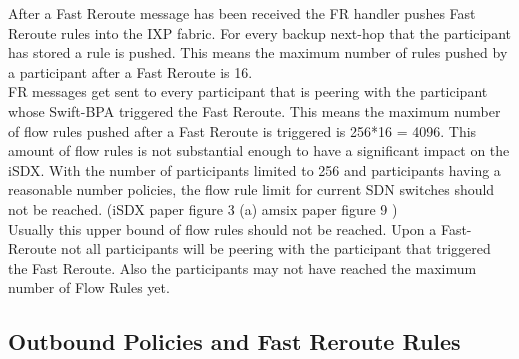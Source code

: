 
After a Fast Reroute message has been received the FR handler pushes Fast Reroute rules into the IXP fabric. For every backup next-hop that the participant has stored a rule is pushed. This means the maximum number of rules pushed by a participant after a Fast Reroute is 16. \\
FR messages get sent to every participant that is peering with the participant whose Swift-BPA triggered the Fast Reroute. This means the maximum number of flow rules pushed after a Fast Reroute is triggered is 256*16 = 4096. This amount of flow rules is not substantial enough to have a significant impact on the iSDX. With the number of participants limited to 256 and participants having a reasonable number policies, the flow rule limit for current SDN switches should not be reached. (iSDX paper figure 3 (a) amsix paper figure 9 )\\
Usually this upper bound of flow rules should not be reached. Upon a Fast-Reroute not all participants will be peering with the participant that triggered the Fast Reroute. Also the participants may not have reached the maximum number of Flow Rules yet.

\subsection{\label{chapter6:number of flow rules:outbound_FR}Outbound Policies and Fast Reroute Rules}

